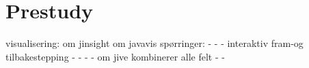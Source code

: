 \section{Prestudy}\label{Prestudy} 
visualisering:
om jinsight
om javavis
spørringer:
-
-
-
interaktiv fram-og tilbakestepping
-
-
-
-
om jive
	kombinerer alle felt
-
-
